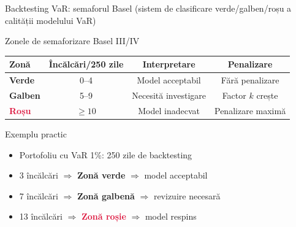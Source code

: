 \documentclass[9pt, aspectratio=169, t]{beamer}
\begin{document}
\begin{frame}{Backtesting VaR: semaforul Basel (sistem de clasificare verde/galben/roșu a calității modelului VaR)}
    \small
        \begin{block}{Zonele de semaforizare Basel III/IV}
            \begin{center}
                \begin{tabular}{lccc}
                    \toprule
                    \textbf{Zonă} & \textbf{Încălcări/250 zile} & \textbf{Interpretare} & \textbf{Penalizare} \\
                    \midrule
                    \cellcolor{Forest!15}\textcolor{Forest}{\textbf{Verde}} & 0--4 & Model acceptabil & Fără penalizare \\
                    \cellcolor{Amber!15}\textcolor{Amber}{\textbf{Galben}} & 5--9 & Necesită investigare & Factor $k$ crește \\
                    \cellcolor{Crimson!15}\textcolor{Crimson}{\textbf{Roșu}} & $\geq 10$ & Model inadecvat & Penalizare maximă \\
                    \bottomrule
                \end{tabular}
            \end{center}
        \end{block}

        \vspace{0.2cm}

        \begin{exampleblock}{Exemplu practic}
            \begin{itemize}
                \item Portofoliu cu VaR 1\%: 250 zile de backtesting
                \item 3 încălcări $\Rightarrow$ \textcolor{Forest}{\textbf{Zonă verde}} $\Rightarrow$ model acceptabil
                \item 7 încălcări $\Rightarrow$ \textcolor{Amber}{\textbf{Zonă galbenă}} $\Rightarrow$ revizuire necesară
                \item 13 încălcări $\Rightarrow$ \textcolor{Crimson}{\textbf{Zonă roșie}} $\Rightarrow$ model respins
            \end{itemize}
        \end{exampleblock}
\end{frame}
\end{document}
